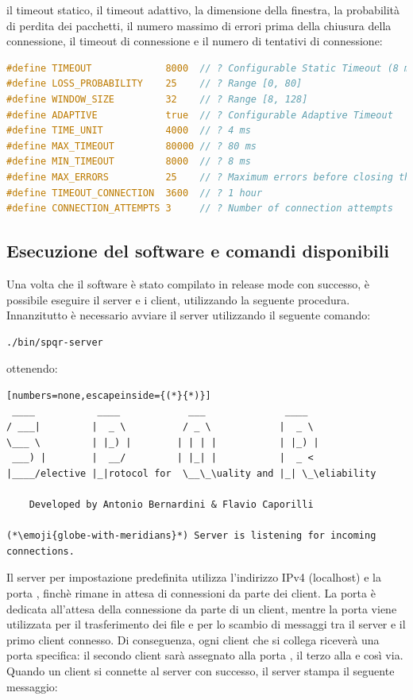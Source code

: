 il timeout statico, il timeout adattivo, la dimensione della finestra, la probabilità di perdita dei pacchetti, il numero massimo di errori prima della chiusura della connessione, il timeout di connessione e il numero di tentativi di connessione:

\begin{lstlisting}[language=C,numbers=none,keywords={define}]
#define TIMEOUT             8000  // ? Configurable Static Timeout (8 ms)
#define LOSS_PROBABILITY    25    // ? Range [0, 80]
#define WINDOW_SIZE         32    // ? Range [8, 128]
#define ADAPTIVE            true  // ? Configurable Adaptive Timeout
#define TIME_UNIT           4000  // ? 4 ms
#define MAX_TIMEOUT         80000 // ? 80 ms
#define MIN_TIMEOUT         8000  // ? 8 ms
#define MAX_ERRORS          25    // ? Maximum errors before closing the connection
#define TIMEOUT_CONNECTION  3600  // ? 1 hour
#define CONNECTION_ATTEMPTS 3     // ? Number of connection attempts
\end{lstlisting}

\subsection{Esecuzione del software e comandi disponibili}
Una volta che il software è stato compilato in release mode con successo, è possibile eseguire il server e i client, utilizzando la seguente procedura.
Innanzitutto è necessario avviare il server utilizzando il seguente comando:

\begin{lstlisting}[numbers=none]
./bin/spqr-server
\end{lstlisting}

ottenendo:

\begin{lstlisting}[numbers=none,escapeinside={(*}{*)}]
 ____           ____            ___              ____  
/ ___|         |  _ \          / _ \            |  _ \ 
\___ \         | |_) |        | | | |           | |_) |
 ___) |        |  __/         | |_| |           |  _ < 
|____/elective |_|rotocol for  \__\_\uality and |_| \_\eliability

    Developed by Antonio Bernardini & Flavio Caporilli

(*\emoji{globe-with-meridians}*) Server is listening for incoming connections.
\end{lstlisting}

Il server per impostazione predefinita utilizza l'indirizzo IPv4  (localhost) e la porta , finchè rimane in attesa di connessioni da parte dei client.
La porta \lstinlinebg{6968} è dedicata all'attesa della connessione da parte di un client, mentre la porta \lstinlinebg{6969} viene utilizzata per il trasferimento dei file e per lo scambio di messaggi tra il server e il primo client connesso.
Di conseguenza, ogni client che si collega riceverà una porta specifica: il secondo client sarà assegnato alla porta \lstinlinebg{6970}, il terzo alla \lstinlinebg{6971} e così via.
Quando un client si connette al server con successo, il server stampa il seguente messaggio:


